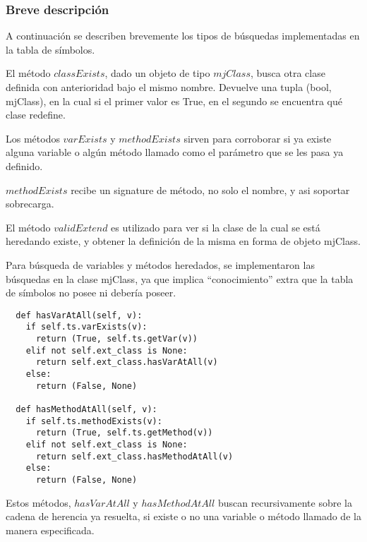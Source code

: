\documentclass [a4paper,abstracton,titlepage]{scrartcl}
\begin{document}
  \subsubsection{Breve descripción}

  A continuación se describen brevemente los tipos de búsquedas implementadas
en la tabla de símbolos.


    El método $classExists$, dado un objeto de tipo $mjClass$, busca otra clase
definida con anterioridad bajo el mismo nombre. Devuelve una tupla (bool,
mjClass), en la cual si el primer valor es True, en el segundo se encuentra qué
clase redefine.


    Los métodos $varExists$ y $methodExists$ sirven para corroborar si ya
existe alguna variable o algún método llamado como el parámetro que se les
pasa ya definido.

    $methodExists$ recibe un signature de método, no solo el nombre, y
asi soportar sobrecarga.


    El método $validExtend$ es utilizado para ver si la clase de la cual se
está heredando existe, y obtener la definición de la misma en forma de objeto
mjClass.


    Para búsqueda de variables y métodos heredados, se implementaron las
búsquedas en la clase mjClass, ya que implica ``conocimiento'' extra que la
tabla de símbolos no posee ni debería poseer.

    \begin{lstlisting}
  def hasVarAtAll(self, v):
    if self.ts.varExists(v):
      return (True, self.ts.getVar(v))
    elif not self.ext_class is None:
      return self.ext_class.hasVarAtAll(v)
    else:
      return (False, None)

  def hasMethodAtAll(self, v):
    if self.ts.methodExists(v):
      return (True, self.ts.getMethod(v))
    elif not self.ext_class is None:
      return self.ext_class.hasMethodAtAll(v)
    else:
      return (False, None)
    \end{lstlisting}

Estos métodos, $hasVarAtAll$ y $hasMethodAtAll$ buscan recursivamente sobre la
cadena de herencia ya resuelta, si existe o no una variable o método llamado de
la manera especificada.
\end{document}
